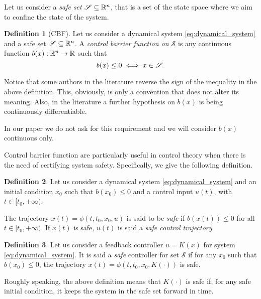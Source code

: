 \documentclass[letterpaper, 10 pt, conference]{ieeeconf}
\newcounter{Definition}
\theoremstyle{definition}
\theoremstyle{nopoint}
\newtheorem{definitionNoPoint}{Definition}
\begin{document}
Let us consider a {\em safe set} $\mathcal{S}\subseteq \Bbb{R}^n$, that is a set of the state space where we aim to confine the state of the system. 


\begin{definitionNoPoint}[CBF]
Let us consider a dynamical system \eqref{eq:dynamical_system} and a safe set $\mathcal{S}\subseteq \Bbb{R}^n$. 
A {\em control barrier function on $\mathcal{S}$} is any continuous function $b(x): \Bbb{R}^n \rightarrow \Bbb{R}$ such that 
\begin{equation}\label{eq:barrier_function}
b(x) \leq 0 \iff x \in \mathcal{S}.\\
\end{equation}
\end{definitionNoPoint}



Notice that some authors in the literature reverse the sign of the inequality in the above definition. This, obviously, is only a convention that does not alter its meaning. Also, in the literature a further hypothesis on $b(x)$ is being continuously differentiable.
 
In our paper we do not ask for this requirement and we will consider $b(x)$ continuous only. 




Control barrier function are particularly useful in control theory when there is the need of certifying system safety. Specifically, we give the following definition. 

\begin{definitionNoPoint}
Let us consider a dynamical system \eqref{eq:dynamical_system}
and an initial condition $x_0$ such that $b(x_0)\leq 0$ and a control input $u(t)$, with $t\in [t_0, +\infty)$. 

The trajectory $x(t)=\phi(t,t_0,x_0,u)$ is said to be {\em safe} if $b(x(t))\leq 0$ for all $t\in [t_0, +\infty)$. If $x(t)$ is safe, $u(t)$ is said a {\em safe control trajectory}.

\end{definitionNoPoint}


\begin{definitionNoPoint}
Let us consider a feedback controller $u=K(x)$ for system  \eqref{eq:dynamical_system}.
It is said a {\em safe} controller for set $\mathcal{S}$ if for any $x_0$ such that $b(x_0)\leq 0$, the trajectory  $x(t)=\phi(t,t_0,x_0,K(\cdot))$ is safe.
\end{definitionNoPoint}

Roughly speaking, the above definition means that $K(\cdot)$ is safe if, for any safe initial condition, it keeps the system in the safe set forward in time. 
\end{document}
